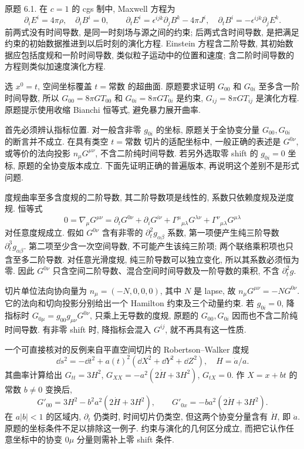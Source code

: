 \begin{exercise}
原题 6.1. 在 $c=1$ 的 cgs 制中, Maxwell 方程为
\[
\partial_iE^i=4\pi\rho,\quad \partial_iB^i=0,\qquad
\partial_tE^i=\epsilon^{ijk}\partial_jB^k-4\pi J^i,\quad
\partial_tB^i=-\epsilon^{ijk}\partial_jE^k.
\]
前两式没有时间导数, 是同一时刻场与源之间的约束; 后两式含时间导数, 是把满足约束的初始数据推进到以后时刻的演化方程. Einstein 方程含二阶导数, 其初始数据应包括度规和一阶时间导数, 类似粒子运动中的位置和速度; 含二阶时间导数的方程则类似加速度演化方程.

选 $x^0=t$, 空间坐标覆盖 $t=\text{常数}$ 的超曲面. 原题要求证明 $G_{00}$ 和 $G_{0i}$ 至多含一阶时间导数, 所以 $G_{00}=8\pi GT_{00}$ 和 $G_{0i}=8\pi GT_{0i}$ 是约束, $G_{ij}=8\pi GT_{ij}$ 是演化方程. 原题提示使用收缩 Bianchi 恒等式, 避免暴力展开曲率.
\end{exercise}
\begin{solution}
首先必须辨认指标位置. 对一般含非零 $g_{0i}$ 的坐标, 原题关于全协变分量 $G_{00},G_{0i}$ 的断言并不成立. 在具有类空 $t=\text{常数}$ 切片的适配坐标中, 一般正确的表述是 $G^{0\nu}$, 或等价的法向投影 $n_\mu G^{\mu\nu}$, 不含二阶纯时间导数. 若另外选取零 shift 的 $g_{0i}=0$ 坐标, 原题的全协变版本成立. 下面先证明正确的普遍版本, 再说明这个差别不是形式问题.

度规曲率至多含度规的二阶导数, 其二阶导数项是线性的, 系数只依赖度规及逆度规. 恒等式
\[
0=\nabla_\mu G^{\mu\nu}
=\partial_tG^{0\nu}+\partial_iG^{i\nu}
+\Gamma^\mu{}_{\mu\lambda}G^{\lambda\nu}
+\Gamma^\nu{}_{\mu\lambda}G^{\mu\lambda}
\]
对任意度规成立. 假如 $G^{0\nu}$ 含有非零的 $\partial_t^2g_{\alpha\beta}$ 系数, 第一项便产生纯三阶导数 $\partial_t^3g_{\alpha\beta}$. 第二项至少含一次空间导数, 不可能产生该纯三阶项; 两个联络乘积项也只含至多二阶导数. 对任意光滑度规, 纯三阶导数可以独立变化, 所以其系数必须恒为零. 因此 $G^{0\nu}$ 只含空间二阶导数、混合空间时间导数及一阶导数的乘积, 不含 $\partial_t^2g$.

切片单位法向协向量为 $n_\mu=(-N,0,0,0)$, 其中 $N$ 是 lapse, 故 $n_\mu G^{\mu\nu}=-NG^{0\nu}$. 它的法向和切向投影分别给出一个 Hamilton 约束及三个动量约束. 若 $g_{0i}=0$, 降指标时 $G_{0\mu}=g_{00}g_{\mu\nu}G^{0\nu}$, 只乘上无导数的度规, 原题的 $G_{00},G_{0i}$ 因而也不含二阶纯时间导数. 有非零 shift 时, 降指标会混入 $G^{ij}$, 就不再具有这一性质.

一个可直接核对的反例来自平直空间切片的 Robertson--Walker 度规
\[
\dd s^2=-\dd t^2+a(t)^2(\dd X^2+\dd Y^2+\dd Z^2),\quad H=\dot a/a.
\]
其曲率计算给出 $G_{tt}=3H^2$, $G_{XX}=-a^2(2\dot H+3H^2)$, $G_{tX}=0$. 作 $X=x+bt$ 的常数 $b\ne0$ 变换后,
\[
G'_{00}=3H^2-b^2a^2(2\dot H+3H^2),\qquad
G'_{0x}=-ba^2(2\dot H+3H^2).
\]
在 $a|b|<1$ 的区域内, $\partial_t$ 仍类时, 时间切片仍类空, 但这两个协变分量含有 $\dot H$, 即 $\ddot a$. 原题的坐标条件不足以排除这一例子. 约束与演化的几何区分成立, 而把它认作任意坐标中的协变 $0\mu$ 分量则需补上零 shift 条件.
\end{solution}

